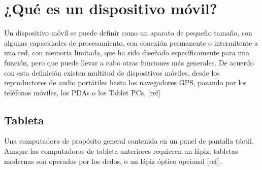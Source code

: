 \section{¿Qué es un dispositivo móvil?}

Un dispositivo móvil se puede definir como un aparato de pequeño tamaño, con algunas capacidades de procesamiento, con conexión permanente o intermitente a una red, con memoria limitada, que ha sido diseñado específicamente para una función, pero que puede llevar a cabo otras funciones más generales. De acuerdo con esta definición existen multitud de dispositivos móviles, desde los reproductores de audio portátiles hasta los navegadores GPS, pasando por los teléfonos móviles, los PDAs o los Tablet PCs. [ref]

\subsection{Tableta}

Una computadora de propósito general contenida en un panel de pantalla táctil. Aunque las computadoras de tableta anteriores requieren un lápiz, tabletas modernas son operadas por los dedos, o un lápiz óptico opcional [ref]. 